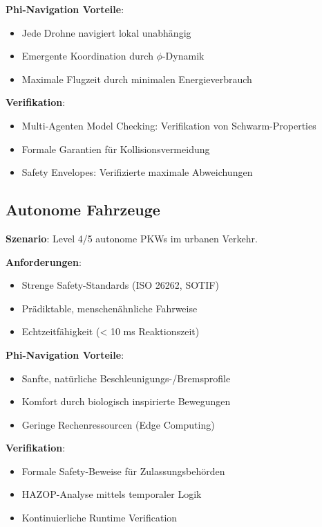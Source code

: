 ﻿\documentclass[a4paper,12pt]{article}
\theoremstyle{definition}
\begin{document}
\textbf{Phi-Navigation Vorteile}:
\begin{itemize}
	\item Jede Drohne navigiert lokal unabhängig
	\item Emergente Koordination durch $\phi$-Dynamik
	\item Maximale Flugzeit durch minimalen Energieverbrauch
\end{itemize}

\textbf{Verifikation}:
\begin{itemize}
	\item Multi-Agenten Model Checking: Verifikation von Schwarm-Properties
	\item Formale Garantien für Kollisionsvermeidung
	\item Safety Envelopes: Verifizierte maximale Abweichungen
\end{itemize}

\subsection{Autonome Fahrzeuge}

\textbf{Szenario}: Level 4/5 autonome PKWs im urbanen Verkehr.

\textbf{Anforderungen}:
\begin{itemize}
	\item Strenge Safety-Standards (ISO 26262, SOTIF)
	\item Prädiktable, menschenähnliche Fahrweise
	\item Echtzeitfähigkeit (< 10 ms Reaktionszeit)
\end{itemize}

\textbf{Phi-Navigation Vorteile}:
\begin{itemize}
	\item Sanfte, natürliche Beschleunigungs-/Bremsprofile
	\item Komfort durch biologisch inspirierte Bewegungen
	\item Geringe Rechenressourcen (Edge Computing)
\end{itemize}

\textbf{Verifikation}:
\begin{itemize}
	\item Formale Safety-Beweise für Zulassungsbehörden
	\item HAZOP-Analyse mittels temporaler Logik
	\item Kontinuierliche Runtime Verification
\end{itemize}
\end{document}
